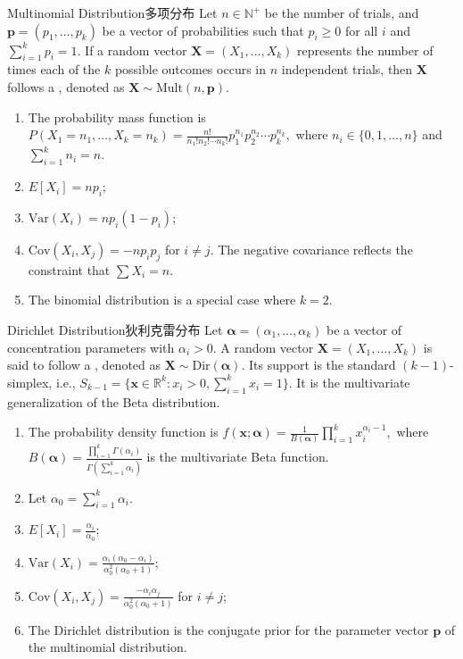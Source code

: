 \documentclass[../main.tex]{subfiles}
\begin{document}
\begin{proposition}{Multinomial Distribution}{多项分布}
Let $n \in \mathbb{N}^+$ be the number of trials, and $\mathbf{p} = (p_1, \ldots, p_k)$ be a vector of probabilities such that $p_i \ge 0$ for all $i$ and $\sum_{i=1}^k p_i = 1$. If a random vector $\mathbf{X} = (X_1, \ldots, X_k)$ represents the number of times each of the $k$ possible outcomes occurs in $n$ independent trials, then $\mathbf{X}$ follows a , denoted as $\mathbf{X} \sim \text{Mult}(n, \mathbf{p})$.
\begin{enumerate}
\item The probability mass function is
$P(X_1=n_1, \ldots, X_k=n_k) = \frac{n!}{n_1! n_2! \cdots n_k!} p_1^{n_1} p_2^{n_2} \cdots p_k^{n_k},$
where $n_i \in \{0, 1, \ldots, n\}$ and $\sum_{i=1}^k n_i = n$.
\item $E[X_i] = np_i$;
\item $\text{Var}(X_i) = np_i(1-p_i)$;
\item $\text{Cov}(X_i, X_j) = -np_i p_j$ for $i \neq j$. The negative covariance reflects the constraint that $\sum X_i = n$.
\item The binomial distribution is a special case where $k=2$.
\end{enumerate}
\end{proposition}
\begin{proposition}{Dirichlet Distribution}{狄利克雷分布}
Let $\boldsymbol{\alpha} = (\alpha_1, \ldots, \alpha_k)$ be a vector of concentration parameters with $\alpha_i > 0$. A random vector $\mathbf{X} = (X_1, \ldots, X_k)$ is said to follow a , denoted as $\mathbf{X} \sim \text{Dir}(\boldsymbol{\alpha})$. Its support is the standard $(k-1)$-simplex, i.e., $S_{k-1} = \{\mathbf{x} \in \mathbb{R}^k : x_i > 0, \sum_{i=1}^k x_i = 1\}$. It is the multivariate generalization of the Beta distribution.
\begin{enumerate}
\item The probability density function is
$f(\mathbf{x}; \boldsymbol{\alpha}) = \frac{1}{B(\boldsymbol{\alpha})} \prod_{i=1}^k x_i^{\alpha_i - 1},$
where $B(\boldsymbol{\alpha}) = \frac{\prod_{i=1}^k \Gamma(\alpha_i)}{\Gamma(\sum_{i=1}^k \alpha_i)}$ is the multivariate Beta function.
\item Let $\alpha_0 = \sum_{i=1}^k \alpha_i$.
\item $E[X_i] = \frac{\alpha_i}{\alpha_0}$;
\item $\text{Var}(X_i) = \frac{\alpha_i(\alpha_0 - \alpha_i)}{\alpha_0^2(\alpha_0+1)}$;
\item $\text{Cov}(X_i, X_j) = \frac{-\alpha_i \alpha_j}{\alpha_0^2(\alpha_0+1)}$ for $i \neq j$;
\item The Dirichlet distribution is the conjugate prior for the parameter vector $\mathbf{p}$ of the multinomial distribution.
\end{enumerate}
\end{proposition}
\end{document}
